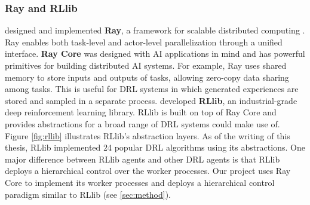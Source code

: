 \subsubsection{Ray and RLlib} \label{sec:ray}
\citeauthor{RayDistributedFramework_Moritz.Nishihara.ea_2018} designed and implemented \textbf{Ray}, a framework for scalable distributed computing \cite{RayDistributedFramework_Moritz.Nishihara.ea_2018}.
Ray enables both task-level and actor-level parallelization through a unified interface.
\textbf{Ray Core} was designed with AI applications in mind and has powerful primitives for building distributed AI systems.
For example, Ray uses shared memory to store inputs and outputs of tasks, allowing zero-copy data sharing among tasks.
This is useful for DRL systems in which generated experiences are stored and sampled in a separate process.
\citeauthor{RLlibAbstractionsDistributed_Liang.Liaw.ea_2018} developed \textbf{RLlib}, an industrial-grade deep reinforcement learning library.
RLlib is built on top of Ray Core and provides abstractions for a broad range of DRL systems could make use of.
Figure \ref{fig:rllib} illustrates RLlib's abstraction layers.
As of the writing of this thesis, RLlib implemented 24 popular DRL algorithms using its abstractions.
One major difference between RLlib agents and other DRL agents is that RLlib deploys a hierarchical control over the worker processes.
Our project uses Ray Core to implement its worker processes and deploys a hierarchical control paradigm similar to RLlib (see \ref{sec:method}).

